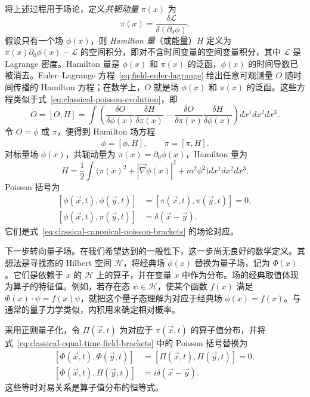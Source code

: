 将上述过程用于场论，定义\emph{共轭动量} $\pi(x)$ 为
\[
\pi(x)=\frac{\delta\mathcal L}{\delta(\partial_0\phi)}.
\]
假设只有一个场 $\phi(x)$，则 \emph{Hamilton 量}（或能量）$H$ 定义为 $\pi(x)\partial_0\phi(x)-\mathcal L$ 的空间积分，即对不含时间变量的空间变量积分，其中 $\mathcal L$ 是 Lagrange 密度。Hamilton 量是 $\phi(x)$ 和 $\pi(x)$ 的泛函，$\phi(x)$ 的时间导数已被消去。Euler--Lagrange 方程~\eqref{eq:field-euler-lagrange} 给出任意可观测量 $O$ 随时间传播的 Hamilton 方程；在数学上，$O$ 就是场 $\phi(x)$ 和 $\pi(x)$ 的泛函。这些方程类似于式~\eqref{eq:classical-poisson-evolution}，即
\[
\dot O=[O,H]=\int
\left(\frac{\delta O}{\delta\phi(x)}\frac{\delta H}{\delta\pi(x)}
-\frac{\delta O}{\delta\pi(x)}\frac{\delta H}{\delta\phi(x)}\right)
dx^1dx^2dx^3.
\]
令 $O=\phi$ 或 $\pi$，便得到 Hamilton 场方程
\[
\dot\phi=[\phi,H],\qquad\dot\pi=[\pi,H].
\]
对标量场 $\phi(x)$，共轭动量为 $\pi(x)=\partial_0\phi(x)$，Hamilton 量为
\begin{equation}\label{eq:scalar-field-hamiltonian}
H=\frac12\int
\bigl(\pi(x)^2+|\vec\nabla\phi(x)|^2+m^2\phi^2\bigr)
dx^1dx^2dx^3.
\end{equation}
Poisson 括号为
\begin{equation}\label{eq:classical-equal-time-field-brackets}
\begin{aligned}
[\phi(\vec x,t),\phi(\vec y,t)]&=[\pi(\vec x,t),\pi(\vec y,t)]=0,\\
[\phi(\vec x,t),\pi(\vec y,t)]&=\delta(\vec x-\vec y).
\end{aligned}
\end{equation}
它们是式~\eqref{eq:classical-canonical-poisson-brackets} 的场论对应。

下一步转向量子场。在我们希望达到的一般性下，这一步尚无良好的数学定义。其想法是寻找态的 Hilbert 空间 $\mathcal H$，将经典场 $\phi(x)$ 替换为量子场，记为 $\Phi(x)$。它们是依赖于 $x$ 的 $\mathcal H$ 上的算子，并在变量 $x$ 中作为分布。场的经典取值体现为算子的特征值。例如，若存在态 $\psi\in\mathcal H$，使某个函数 $f(x)$ 满足 $\Phi(x)\cdot\psi=f(x)\psi$，就把这个量子态理解为对应于经典场 $\phi(x)=f(x)$。与通常的量子力学类似，内积用来确定相对概率。

采用正则量子化，令 $\Pi(\vec x,t)$ 为对应于 $\pi(\vec x,t)$ 的算子值分布，并将式~\eqref{eq:classical-equal-time-field-brackets} 中的 Poisson 括号替换为
\[
\begin{aligned}
[\Phi(\vec x,t),\Phi(\vec y,t)]&=[\Pi(\vec x,t),\Pi(\vec y,t)]=0,\\
[\Phi(\vec x,t),\Pi(\vec y,t)]&=i\delta(\vec x-\vec y).
\end{aligned}
\]
这些等时对易关系是算子值分布的恒等式。

